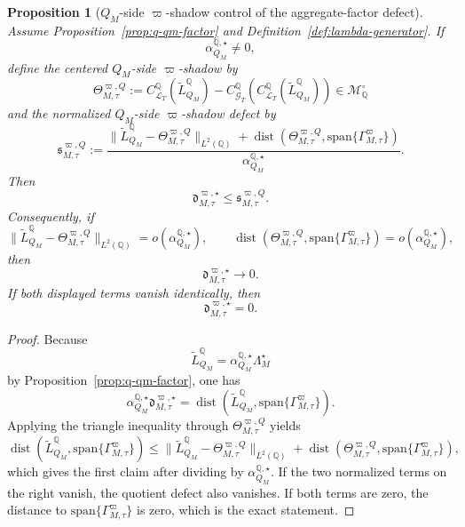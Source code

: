 \documentclass[11pt,a4paper]{amsart}
\theoremstyle{plain}
\newtheorem{proposition}[theorem]{Proposition}
\theoremstyle{definition}
\theoremstyle{remark}
\DeclareMathOperator{\dist}{dist}
\newcommand{\QQ}{\mathbb{Q}}
\newcommand{\cG}{\mathcal{G}}
\newcommand{\cL}{\mathcal{L}}
\newcommand{\cM}{\mathcal{M}}
\begin{document}
\begin{proposition}[\(Q_M\)-side \(\varpi\)-shadow control of the aggregate-factor defect]\label{prop:lambda-shadow}
Assume Proposition~\ref{prop:q-qm-factor} and Definition~\ref{def:lambda-generator}.  If
\[
        \alpha_{Q_M}^{\QQ,\star}\neq0,
\]
define the centered \(Q_M\)-side \(\varpi\)-shadow by
\[
        \Theta_{M,\tau}^{\varpi,Q}
        :=
        C_{\cL_T}^\QQ(\widetilde L_{Q_M}^\QQ)
        -
        C_{\cG_T}^\QQ\!\left(
                C_{\cL_T}^\QQ(\widetilde L_{Q_M}^\QQ)
        \right)
        \in
        \cM_\QQ^\circ
\]
and the normalized \(Q_M\)-side \(\varpi\)-shadow defect by
\[
        \mathfrak s_{M,\tau}^{\varpi,Q}
        :=
        \frac{
                \|\widetilde L_{Q_M}^\QQ-\Theta_{M,\tau}^{\varpi,Q}\|_{L^2(\QQ)}
                +
                \dist\!\left(
                        \Theta_{M,\tau}^{\varpi,Q},
                        \mathrm{span}\{\Gamma_{M,\tau}^\varpi\}
                \right)
        }{\alpha_{Q_M}^{\QQ,\star}}.
\]
Then
\[
        \mathfrak d_{M,\tau}^{\varpi,\star}
        \le
        \mathfrak s_{M,\tau}^{\varpi,Q}.
\]
Consequently, if
\[
        \|\widetilde L_{Q_M}^\QQ-\Theta_{M,\tau}^{\varpi,Q}\|_{L^2(\QQ)}
        =
        o\!\left(\alpha_{Q_M}^{\QQ,\star}\right),
        \qquad
        \dist\!\left(
                \Theta_{M,\tau}^{\varpi,Q},
                \mathrm{span}\{\Gamma_{M,\tau}^\varpi\}
        \right)
        =
        o\!\left(\alpha_{Q_M}^{\QQ,\star}\right),
\]
then
\[
        \mathfrak d_{M,\tau}^{\varpi,\star}\to 0.
\]
If both displayed terms vanish identically, then
\[
        \mathfrak d_{M,\tau}^{\varpi,\star}=0.
\]
\end{proposition}

\begin{proof}
Because
\[
        \widetilde L_{Q_M}^\QQ
        =
        \alpha_{Q_M}^{\QQ,\star}\Lambda_M^\star
\]
by Proposition~\ref{prop:q-qm-factor}, one has
\[
        \alpha_{Q_M}^{\QQ,\star}\mathfrak d_{M,\tau}^{\varpi,\star}
        =
        \dist\!\left(
                \widetilde L_{Q_M}^\QQ,
                \mathrm{span}\{\Gamma_{M,\tau}^\varpi\}
        \right).
\]
Applying the triangle inequality through \(\Theta_{M,\tau}^{\varpi,Q}\) yields
\[
        \dist\!\left(
                \widetilde L_{Q_M}^\QQ,
                \mathrm{span}\{\Gamma_{M,\tau}^\varpi\}
        \right)
        \le
        \|\widetilde L_{Q_M}^\QQ-\Theta_{M,\tau}^{\varpi,Q}\|_{L^2(\QQ)}
        +
        \dist\!\left(
                \Theta_{M,\tau}^{\varpi,Q},
                \mathrm{span}\{\Gamma_{M,\tau}^\varpi\}
        \right),
\]
which gives the first claim after dividing by \(\alpha_{Q_M}^{\QQ,\star}\).  If the two normalized
terms on the right vanish, the quotient defect also vanishes.  If both terms are zero, the
distance to \(\mathrm{span}\{\Gamma_{M,\tau}^\varpi\}\) is zero, which is the exact statement.
\end{proof}
\end{document}
